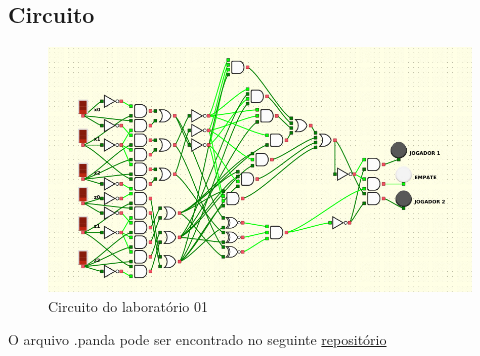 \documentclass{article}
\begin{document}
\subsection{Circuito}

\begin{figure}[!h]
\centering
\includegraphics[width=15cm]{circuito.jpeg}
\caption{Circuito do laboratório 01}
\label{fig:CL_logo}
\end{figure}

O arquivo .panda pode ser encontrado no seguinte \href{https://github.com/aamgoulart/circuitosDigitais}{repositório}
\end{document}
